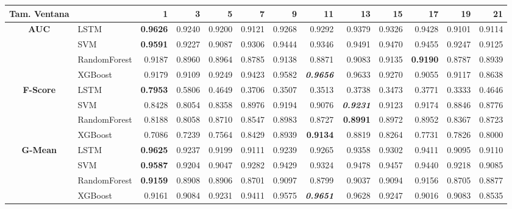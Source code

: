 \begin{table}[H]
	\centering
	\begin{adjustbox}{max width=12cm}
		\begin{tabular}{|c|l|r|r|r|r|r|r|r|r|r|r|r|}
			
			\hline
			\textbf{Tam. Ventana}&         &      1  &      3  &      5  &      7  &      9  &      11 &      13 &      15 &      17 &      19 &      21 \\
			\hline
			\textbf{AUC} & LSTM &  \textbf{0.9626} &  0.9240 &  0.9200 &  0.9121 &  0.9268 &  0.9292 &  0.9379 &  0.9326 &  0.9428 &  0.9101 &  0.9114 \\
			& SVM &  \textbf{0.9591} &  0.9227 &  0.9087 &  0.9306 &  0.9444 &  0.9346 &  0.9491 &  0.9470 &  0.9455 &  0.9247 &  0.9125 \\
			& RandomForest &  0.9187 &  0.8960 &  0.8964 &  0.8785 &  0.9138 &  0.8871 &  0.9083 &  0.9135 &  \textbf{0.9190} &  0.8787 &  0.8939 \\
			& XGBoost &  0.9179 &  0.9109 &  0.9249 &  0.9423 &  0.9582 &  \textit{\textbf{0.9656}} &  0.9633 &  0.9270 &  0.9055 &  0.9117 &  0.8638 \\
			\hline
			\textbf{F-Score} & LSTM &  \textbf{0.7953} &  0.5806 &  0.4649 &  0.3706 &  0.3507 &  0.3513 &  0.3738 &  0.3473 &  0.3771 &  0.3333 &  0.4646 \\
			& SVM &  0.8428 &  0.8054 &  0.8358 &  0.8976 &  0.9194 &  0.9076 &  \textit{\textbf{0.9231}} &  0.9123 &  0.9174 &  0.8846 &  0.8776 \\
			& RandomForest &  0.8188 &  0.8058 &  0.8710 &  0.8547 &  0.8983 &  0.8727 &  \textbf{0.8991} &  0.8972 &  0.8952 &  0.8367 &  0.8723 \\
			& XGBoost &  0.7086 &  0.7239 &  0.7564 &  0.8429 &  0.8939 &  \textbf{0.9134} &  0.8819 &  0.8264 &  0.7731 &  0.7826 &  0.8000 \\
			\hline
			\textbf{G-Mean} & LSTM &  \textbf{0.9625} &  0.9237 &  0.9199 &  0.9111 &  0.9239 &  0.9265 &  0.9358 &  0.9302 &  0.9411 &  0.9095 &  0.9110 \\
			& SVM &  \textbf{0.9587} &  0.9204 &  0.9047 &  0.9282 &  0.9429 &  0.9324 &  0.9478 &  0.9457 &  0.9440 &  0.9218 &  0.9085 \\
			& RandomForest &  \textbf{0.9159} &  0.8908 &  0.8906 &  0.8701 &  0.9097 &  0.8799 &  0.9037 &  0.9094 &  0.9156 &  0.8705 &  0.8877 \\
			& XGBoost &  0.9161 &  0.9084 &  0.9231 &  0.9411 &  0.9575 &  \textit{\textbf{0.9651}} &  0.9628 &  0.9247 &  0.9016 &  0.9083 &  0.8535 \\

\end{tabular}
\end{adjustbox}
\end{table}
